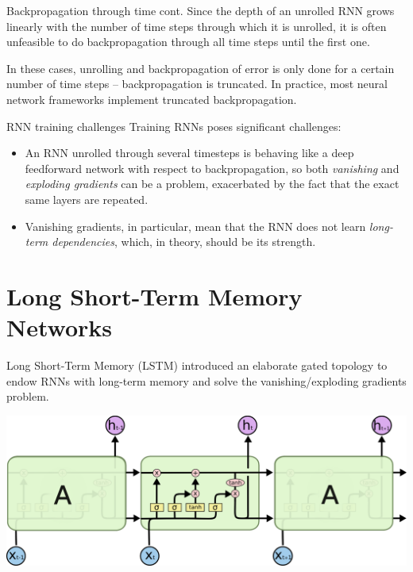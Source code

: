 \documentclass[style=upen, size=14pt]{powerdot}
\newcommand{\gold}{\color{arany}}
\theoremstyle{definition}
\begin{document}
\begin{slide}[toc=]{Backpropagation through time cont.}
  Since the depth of an unrolled RNN grows linearly with the number of time
  steps through which it is unrolled, it is often unfeasible to do
  backpropagation through all time steps until the first one. \bigskip

  In these cases, unrolling and backpropagation of error is only done for a
  certain number of time steps -- backpropagation is truncated. In practice,
  most neural network frameworks implement truncated backpropagation.
\end{slide}

\begin{slide}[toc=Challenges]{RNN training challenges}
  Training RNNs poses significant challenges:
  \begin{itemize}
  \item An RNN unrolled through several timesteps is behaving like a deep
    feedforward network with respect to backpropagation, so both \emph{\gold
      vanishing} and \emph{\gold exploding gradients} can be a problem,
    exacerbated by the fact that the exact same layers are repeated.
  \item Vanishing gradients, in particular, mean that the RNN does not learn
    \emph{\gold long-term dependencies}, which, in theory, should be its
    strength.
  \end{itemize}
\end{slide}

\section[toc=LSTMs]{Long Short-Term Memory Networks}

\begin{slide}[toc=LSTM]{Long Short-Term Memory (LSTM)}
  \cite{hochreiter1997long} introduced an elaborate gated topology to endow RNNs
  with long-term memory and solve the vanishing/exploding gradients problem.
  \begin{center}
    \includegraphics[width=1\textwidth]{figures/LSTM3-chain.eps}
  \end{center}
\end{slide}
\end{document}
